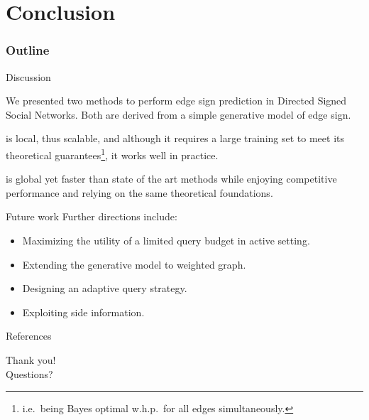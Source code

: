 \documentclass[10pt,svgnames,ignorenonframetext,final]{beamer}
\providecommand{\largelist}{%
  \setlength{\itemsep}{8pt}\setlength{\parskip}{3pt}}
\begin{document}
\section{Conclusion}\label{conclusion}
  \begin{frame} \frametitle{Outline} \tableofcontents[currentsection] \end{frame}

\begin{frame}{Discussion}

We presented two methods to perform edge sign prediction in Directed Signed
Social Networks. Both are derived from a simple generative model of edge
sign.

\alert{\usrule{} is local}, thus scalable, and although it requires a large training
set to meet its theoretical guarantees\footnote{i.e.~being Bayes optimal
w.h.p.~for all edges simultaneously.}, it works well in practice.

\alert{\uslpropGsec{} is global} yet faster than state of the art
methods while enjoying competitive performance and relying on the same
theoretical foundations.

\end{frame}
\begin{frame}{Future work}
Further directions include:

\begin{itemize}
  \largelist
  \item
    Maximizing the utility of a limited query budget in active setting.
  \item
    Extending the generative model to weighted graph.
  \item
    Designing an adaptive query strategy.
  \item
    Exploiting side information.
\end{itemize}

\end{frame}


\begin{frame}[allowframebreaks]{References}
  \printbibliography
\end{frame}

\begin{frame}[plain,c]

\begin{center}
\Huge Thank you! \\ Questions?
\end{center}

\end{frame}
\end{document}
